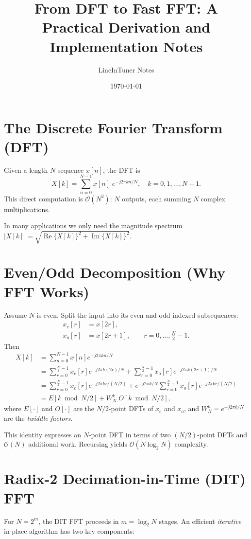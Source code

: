 \documentclass[11pt,a4paper]{article}
\title{From DFT to Fast FFT: A Practical Derivation and Implementation Notes}
\author{LineInTuner Notes}
\date{\today}
\begin{document}
\maketitle

\section{The Discrete Fourier Transform (DFT)}
Given a length-$N$ sequence $x[n]$, the DFT is
\begin{equation}
X[k] = \sum_{n=0}^{N-1} x[n] \; e^{-j 2\pi k n / N}, \quad k=0,1,\dots,N-1.
\end{equation}
This direct computation is $\mathcal{O}(N^2)$: $N$ outputs, each summing $N$ complex multiplications.

In many applications we only need the magnitude spectrum $|X[k]| = \sqrt{\operatorname{Re}\{X[k]\}^2 + \operatorname{Im}\{X[k]\}^2}$.

\section{Even/Odd Decomposition (Why FFT Works)}
Assume $N$ is even. Split the input into its even and odd-indexed subsequences:
\begin{align}
 x_e[r] &= x[2r], \\[-0.25em]
 x_o[r] &= x[2r+1], \qquad r=0,\dots,\frac{N}{2}-1.
\end{align}
Then
\begin{align}
X[k]
&= \sum_{n=0}^{N-1} x[n] e^{-j 2\pi k n / N} \\
&= \sum_{r=0}^{\frac{N}{2}-1} x_e[r] e^{-j 2\pi k (2r)/N}
  + \sum_{r=0}^{\frac{N}{2}-1} x_o[r] e^{-j 2\pi k (2r+1)/N} \\
&= \sum_{r=0}^{\frac{N}{2}-1} x_e[r] e^{-j 2\pi k r /(N/2)}
  + e^{-j 2\pi k/N} \sum_{r=0}^{\frac{N}{2}-1} x_o[r] e^{-j 2\pi k r /(N/2)} \\
&= E[k \bmod N/2] + W_N^k \; O[k \bmod N/2],
\end{align}
where $E[\cdot]$ and $O[\cdot]$ are the $N/2$-point DFTs of $x_e$ and $x_o$, and $W_N^k = e^{-j 2\pi k/N}$ are the \emph{twiddle factors}.

This identity expresses an $N$-point DFT in terms of two $(N/2)$-point DFTs and $\mathcal{O}(N)$ additional work. Recursing yields $\mathcal{O}(N \log_2 N)$ complexity.

\section{Radix-2 Decimation-in-Time (DIT) FFT}
For $N=2^m$, the DIT FFT proceeds in $m=\log_2 N$ stages. An efficient \emph{iterative} in-place algorithm has two key components:
\end{document}
